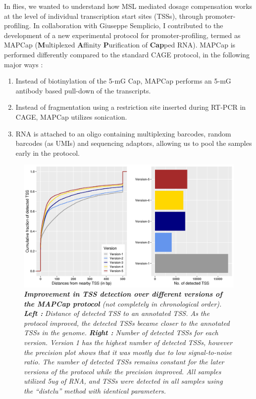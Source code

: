\documentclass[11pt,twoside]{MPIthesis}
\theoremstyle{definition}
\theoremstyle{definition}
\theoremstyle{definition}
\theoremstyle{remark}
\begin{document}
In flies, we wanted to understand how MSL mediated dosage compensation
works at the level of individual transcription start sites (TSSs),
through promoter-profiling. In collaboration with Giuseppe Semplicio, I
contributed to the development of a new experimental protocol for
promoter-profiling, termed as MAPCap (\textbf{M}ultiplexed
\textbf{A}ffinity \textbf{P}urification of \textbf{Cap}ped RNA). MAPCap
is performed differently compared to the standard CAGE protocol, in the
following major ways :
\begin{enumerate}
\def\labelenumi{\arabic{enumi}.}
\item
  Instead of biotinylation of the 5-mG Cap, MAPCap performs an 5-mG
  antibody based pull-down of the transcripts.
\item
  Instead of fragmentation using a restriction site inserted during
  RT-PCR in CAGE, MAPCap utilizes sonication.
\item
  RNA is attached to an oligo containing multiplexing barcodes, random
  barcodes (as UMIs) and sequencing adaptors, allowing us to pool the
  samples early in the protocol.
\end{enumerate}
\clearpage
\begin{figure}

{\centering \includegraphics[width=0.9\linewidth]{figures/results_fig4} 

}

\caption[Improvement in TSS detection over different versions of the MAPCap protocol]{\emph{\textbf{Improvement in TSS detection over different
versions of the MAPCap protocol} (not completely in chronological
order). \textbf{Left :}} \emph{Distance} \emph{of detected TSS to an
annotated TSS. As the protocol improved, the detected TSSs became closer
to the annotated TSSs in the genome. \textbf{Right :} Number of detected
TSSs for each version. Version 1 has the highest number of detected
TSSs, however the precision plot shows that it was mostly due to low
signal-to-noise ratio. The number of detected TSSs remains constant for
the later versions of the protocol while the precision improved. All
samples utilized 5ug of RNA, and TSSs were detected in all samples using
the ``distclu'' method with identical parameters. }}\label{fig:unnamed-chunk-9}
\end{figure}
\end{document}
